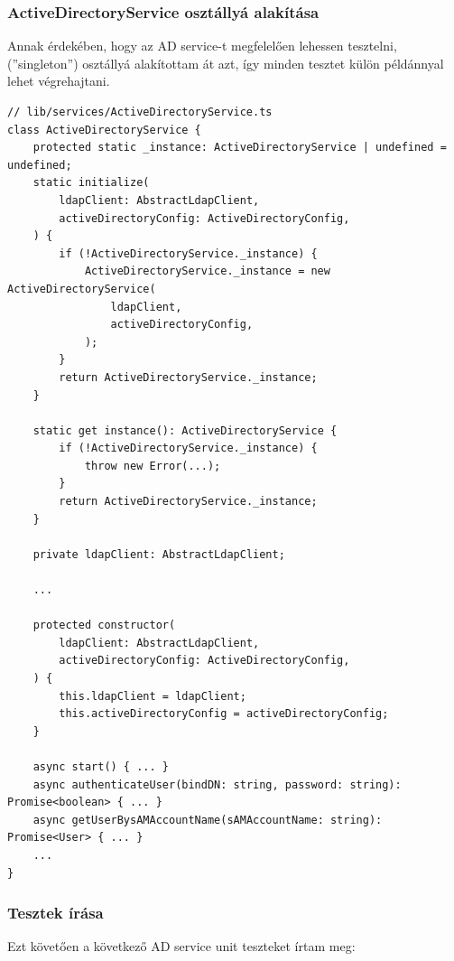 \documentclass[a4paper]{article}
\begin{document}
\subsubsection*{ActiveDirectoryService osztállyá alakítása}

Annak érdekében, hogy az AD service-t megfelelően lehessen tesztelni, (”singleton”) osztállyá
alakítottam át azt, így minden tesztet külön példánnyal lehet végrehajtani.

\FloatBarrier
\begin{verbatim}
// lib/services/ActiveDirectoryService.ts
class ActiveDirectoryService {
    protected static _instance: ActiveDirectoryService | undefined = undefined;
    static initialize(
        ldapClient: AbstractLdapClient,
        activeDirectoryConfig: ActiveDirectoryConfig,
    ) {
        if (!ActiveDirectoryService._instance) {
            ActiveDirectoryService._instance = new ActiveDirectoryService(
                ldapClient,
                activeDirectoryConfig,
            );
        }
        return ActiveDirectoryService._instance;
    }

    static get instance(): ActiveDirectoryService {
        if (!ActiveDirectoryService._instance) {
            throw new Error(...);
        }
        return ActiveDirectoryService._instance;
    }

    private ldapClient: AbstractLdapClient;

    ...

    protected constructor(
        ldapClient: AbstractLdapClient,
        activeDirectoryConfig: ActiveDirectoryConfig,
    ) {
        this.ldapClient = ldapClient;
        this.activeDirectoryConfig = activeDirectoryConfig;
    }

    async start() { ... }
    async authenticateUser(bindDN: string, password: string): Promise<boolean> { ... }
    async getUserBysAMAccountName(sAMAccountName: string): Promise<User> { ... }
    ...
}
\end{verbatim}

\subsubsection*{Tesztek írása}

Ezt követően a következő AD service unit teszteket írtam meg:
\end{document}
